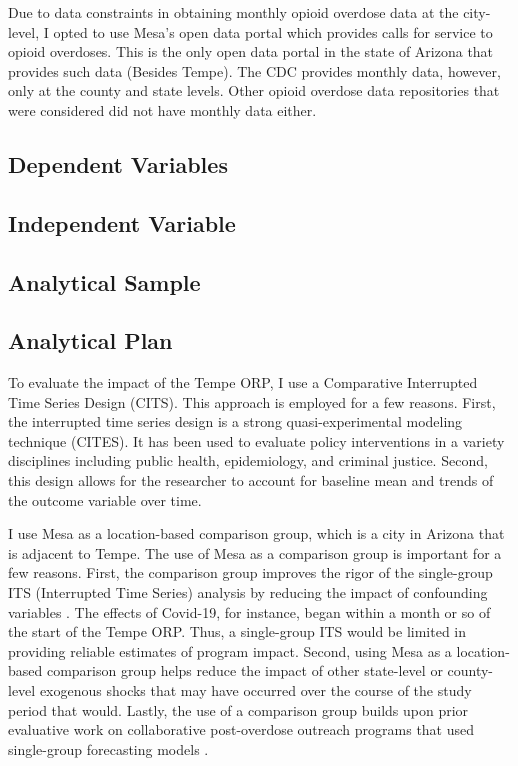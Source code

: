 Due to data constraints in obtaining monthly opioid overdose data at the city-level, I opted to use Mesa's open data portal which provides calls for service to opioid overdoses. This is the only open data portal in the state of Arizona that provides such data (Besides Tempe). The CDC provides monthly data, however, only at the county and state levels. Other opioid overdose data repositories that were considered did not have monthly data either.

\subsection{Dependent Variables}
\subsection{Independent Variable}
\subsection{Analytical Sample}
\subsection{Analytical Plan}

To evaluate the impact of the Tempe ORP, I use a Comparative Interrupted Time Series Design (CITS). This approach is employed for a few reasons. First, the interrupted time series design is a strong quasi-experimental modeling technique (CITES). It has been used to evaluate policy interventions in a variety disciplines including public health, epidemiology, and criminal justice. Second, this design allows for the researcher to account for baseline mean and trends of the outcome variable over time.

I use Mesa as a location-based comparison group, which is a city in Arizona that is adjacent to Tempe. The use of Mesa as a comparison group is important for a few reasons. First, the comparison group improves the rigor of the single-group ITS (Interrupted Time Series) analysis by reducing the impact of confounding variables \parencite{shadish_experimental_2002}. The effects of Covid-19, for instance, began within a month or so of the start of the Tempe ORP. Thus, a single-group ITS would be limited in providing reliable estimates of program impact. Second, using Mesa as a location-based comparison group helps reduce the impact of other state-level or county-level exogenous shocks that may have occurred over the course of the study period that would. Lastly, the use of a comparison group builds upon prior evaluative work on collaborative post-overdose outreach programs that used single-group forecasting models \parencite{donnelly_law_2022}.

